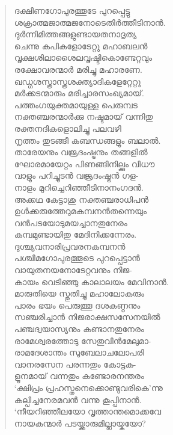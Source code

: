 \begin{verse}
ദക്ഷിണഗോപുരത്തൂടേ പുറപ്പെട്ടു\\
ശക്രാത്മജാത്മജനോടെതിര്‍ത്തീടിനാന്‍.\\
ദുര്‍ന്നിമിത്തങ്ങളുണ്ടായതനാദൃത്യ\\
ചെന്നു കപികളോടേറ്റു മഹാബലന്‍\\
വൃക്ഷശിലാശൈലവൃഷ്ടികൊണ്ടേറ്റവും\\
രക്ഷോവരന്മാര്‍ മരിച്ചു മഹാരണേ.\\
ഖഡ്ഗശസ്ത്രാസ്ത്രശക്ത്യാദികളേറ്റേറ്റു\\
മര്‍ക്കടന്മാരും മരിച്ചാരസംഖ്യമായ്.\\
പത്തംഗയുക്തമായുള്ള പെരുമ്പട\\
നക്തഞ്ചരന്മാര്‍ക്കു നഷ്ടമായ് വന്നിതു\\
രക്തനദികളൊലിച്ചു പലവഴി\\
നൃത്തം തുടങ്ങീ കബന്ധങ്ങളും ബലാല്‍.\\
താരേയനും വജ്രദംഷ്ട്രനും തങ്ങളില്‍\\
ഘോരമായേറ്റം പിണങ്ങിനില്ക്കും വിധൗ\\
വാളും പറിച്ചുടന്‍ വജ്രദംഷ്ട്രന്‍ ഗള-\\
നാളം മുറിച്ചെറിഞ്ഞീടിനാനംഗദന്‍.\\
അക്കഥ കേട്ടാശു നക്തഞ്ചരാധിപന്‍\\
ഉള്‍ക്കരുത്തേറുമകമ്പനന്‍തന്നെയും\\
വന്‍പടയോടുമയച്ചാനതുനേരം\\
കമ്പമുണ്ടായിതു മേദിനിക്കന്നേരം.\\
ദുശ്ച്യവനാരിപ്രവരനകമ്പനന്‍\\
പശ്ചിമഗോപുരത്തൂടെ പുറപ്പെട്ടാന്‍\\
വായുതനയനോടേറ്റവനും നിജ-\\
കായം വെടിഞ്ഞു കാലാലയം മേവിനാന്‍.\\
മാരുതിയെ സ്തുതിച്ചു മഹാലോകരും\\
പാരം ഭയം പെരുത്തൂ ദശകണ്ഠനും\\
സഞ്ചരിച്ചാന്‍ നിജരാക്ഷസസേനയില്‍\\
പഞ്ചദ്വയാസ്യനും കണ്ടാനതുനേരം\\
രാമേശ്വരത്തോടു സേതുവിന്‍മേലുമാ-\\
രാമദേശാന്തം സുബേലാചലോപരി\\
വാനരസേന പരന്നതും കോട്ടക-\\
ളൂനമായ് വന്നതും കണ്ടോരനന്തരം\\
‘ക്ഷിപ്രം പ്രഹസ്തനെക്കൊണ്ടുവരികെ’ന്നു\\
കല്പിച്ചനേരമവന്‍ വന്നു കൂപ്പിനാന്‍.\\
‘നീയറിഞ്ഞീലയോ വൃത്താന്തമൊക്കവേ\\
നായകന്മാര്‍ പടയ്ക്കാരുമില്ലായ്കയോ?\\

\end{verse}

